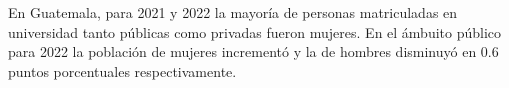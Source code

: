 En Guatemala, para 2021 y 2022 la mayoría de personas matriculadas en universidad tanto públicas como privadas fueron mujeres. En el ámbuito público para 2022 la población de mujeres incrementó y la de hombres disminuyó en 0.6 puntos porcentuales respectivamente. 